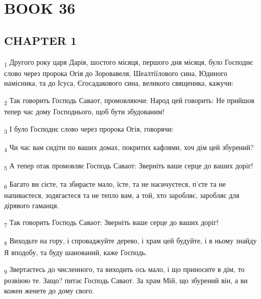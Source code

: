 \section{BOOK 36}
\subsection{CHAPTER 1}
\begin{tcolorbox}
\textsubscript{1} Другого року царя Дарія, шостого місяця, першого дня місяця, було Господнє слово через пророка Огія до Зоровавеля, Шеалтіїлового сина, Юдиного намісника, та до Ісуса, Єгосадакового сина, великого священика, кажучи:
\end{tcolorbox}
\begin{tcolorbox}
\textsubscript{2} Так говорить Господь Саваот, промовляючи: Народ цей говорить: Не прийшов тепер час дому Господнього, щоб бути збудованим!
\end{tcolorbox}
\begin{tcolorbox}
\textsubscript{3} І було Господнє слово через пророка Огія, говорячи:
\end{tcolorbox}
\begin{tcolorbox}
\textsubscript{4} Чи час вам сидіти по ваших домах, покритих кафлями, хоч дім цей збурений?
\end{tcolorbox}
\begin{tcolorbox}
\textsubscript{5} А тепер отак промовляє Господь Саваот: Зверніть ваше серце до ваших доріг!
\end{tcolorbox}
\begin{tcolorbox}
\textsubscript{6} Багато ви сієте, та збираєте мало, їсте, та не насичуєтеся, п'єте та не напиваєтеся, зодягаєтеся та не тепло вам, а той, хто заробляє, заробляє для дірявого гаманця.
\end{tcolorbox}
\begin{tcolorbox}
\textsubscript{7} Так говорить Господь Саваот: Зверніть ваше серце до ваших доріг!
\end{tcolorbox}
\begin{tcolorbox}
\textsubscript{8} Виходьте на гору, і спроваджуйте дерево, і храм цей будуйте, і в ньому знайду Я вподобу, та буду шанований, каже Господь.
\end{tcolorbox}
\begin{tcolorbox}
\textsubscript{9} Звертаєтесь до численного, та виходить ось мало, і що приносите в дім, то розвіюю те. Защо? питає Господь Саваот. За храм Мій, що збурений він, а ви кожен женете до дому свого.
\end{tcolorbox}
